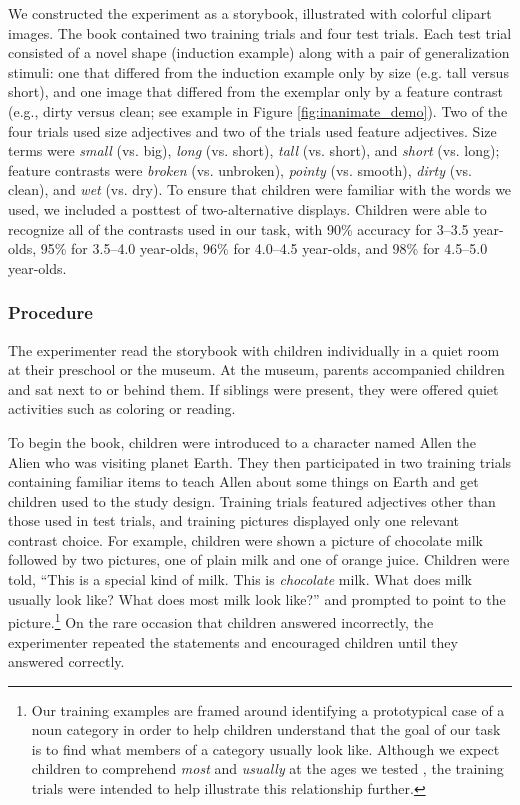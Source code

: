 \documentclass[man]{apa2}
\begin{document}
We constructed the experiment as a storybook, illustrated with colorful clipart images. The book contained two training trials and four test trials. Each test trial consisted of a novel shape (induction example) along with a pair of generalization stimuli: one that differed from the induction example only by size (e.g. tall versus short), and one image that differed from the exemplar only by a feature contrast (e.g., dirty versus clean; see example in Figure \ref{fig:inanimate_demo}). Two of the four trials used size adjectives and two of the trials used feature adjectives. Size terms were \emph{small} (vs. big), \emph{long} (vs. short), \emph{tall} (vs. short), and \emph{short} (vs. long);  feature contrasts were \emph{broken} (vs. unbroken), \emph{pointy} (vs. smooth), \emph{dirty} (vs. clean), and \emph{wet} (vs. dry).  To ensure that children were familiar with the words we used, we included a posttest of two-alternative displays.  Children were able to recognize all of the contrasts used in our task, with 90\% accuracy for 3--3.5 year-olds, 95\% for 3.5--4.0 year-olds, 96\% for 4.0--4.5 year-olds, and 98\% for 4.5--5.0 year-olds.  

\subsubsection{Procedure}

The experimenter read the storybook with children individually in a quiet room at their preschool or the museum.  At the museum, parents accompanied children and sat next to or behind them.  If siblings were present, they were offered quiet activities such as coloring or reading.

To begin the book, children were introduced to a character named Allen the Alien who was visiting planet Earth.  They then participated in two training trials containing familiar items to teach Allen about some things on Earth and get children used to the study design.  Training trials featured adjectives other than those used in test trials, and training pictures displayed only one relevant contrast choice.  For example, children were shown a picture of chocolate milk followed by two pictures, one of plain milk and one of orange juice. Children were told, ``This is a special kind of milk. This is \emph{chocolate} milk.  What does milk usually look like?  What does most milk look like?'' and prompted to point to the picture.\footnote{Our training examples are framed around identifying a prototypical case of a noun category in order to help children understand that the goal of our task is to find what members of a category usually look like. Although we expect children to comprehend \emph{most} and \emph{usually} at the ages we tested \cite{halberda2008}, the training trials were intended to  help illustrate this relationship further.}
On the rare occasion that children answered incorrectly, the experimenter repeated the statements and encouraged children until they answered correctly.  
\end{document}
